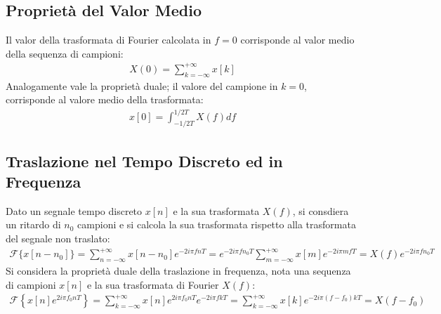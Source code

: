 \documentclass{article}
\numberwithin{equation}{subsection}
\begin{document}
\subsection{Proprietà del Valor Medio}

Il valor della trasformata di Fourier calcolata in $f=0$ corrisponde al valor medio della sequenza di campioni:
\begin{gather*}
    X(0)=\displaystyle\sum_{k=-\infty}^{+\infty}x[k]
\end{gather*}
Analogamente vale la proprietà duale; il valore del campione in $k=0$, corrisponde al valore medio della trasformata:
\begin{gather*}
    x[0]=\displaystyle\int_{-1/2T}^{1/2T}X(f)df
\end{gather*}

\subsection{Traslazione nel Tempo Discreto ed in Frequenza}

Dato un segnale tempo discreto $x[n]$ e la sua trasformata $X(f)$, si consdiera un ritardo di $n_0$ campioni e si calcola la sua trasformata rispetto alla trasformata del 
segnale non traslato:
\begin{gather*}
    \mathscr{F}\{x[n-n_0]\}=\displaystyle\sum_{n=-\infty}^{+\infty}x[n-n_0]e^{-2i\pi fnT}=e^{-2i\pi fn_0T}\sum_{m=-\infty}^{+\infty}x[m]e^{-2i\pi mfT}=X(f)e^{-2i\pi fn_0T}
\end{gather*}
Si considera la proprietà duale della traslazione in frequenza, nota una sequenza di campioni $x[n]$ e la sua trasformata di Fourier $X(f)$:
\begin{gather*}
    \mathscr{F}\left\{x[n]e^{2i\pi f_0nT}\right\}=\displaystyle\sum_{k=-\infty}^{+\infty}x[n]e^{2i\pi f_0nT}e^{-2i\pi fkT}=\sum_{k=-\infty}^{+\infty}x[k]e^{-2i\pi (f-f_0)kT}=X(f-f_0)
\end{gather*} 
\end{document}

